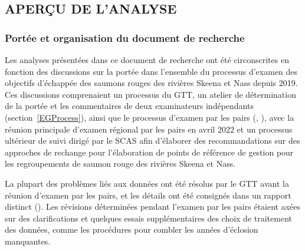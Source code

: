 \documentclass[french,11pt]{book}
\begin{document}
\subsection{APERÇU DE L'ANALYSE}\label{AnalysisOverview}

\subsubsection{Portée et organisation du document de recherche}\label{PaperScopeOrg}

Les analyses présentées dans ce document de recherche ont été circonscrites en fonction des discussions sur la portée dans l'ensemble du processus d'examen des objectifs d'échappée des saumons rouges des rivières Skeena et Nass depuis 2019. Ces discussions comprenaient un processus du GTT, un atelier de détermination de la portée et les commentaires de deux examinateurs indépendants (section~\ref{EGProcess}), ainsi que le processus d'examen par les pairs (, ), avec la réunion principale d'examen régional par les pairs en avril 2022 et un processus ultérieur de suivi dirigé par le SCAS afin d'élaborer des recommandations sur des approches de rechange pour l'élaboration de points de référence de gestion pour les regroupements de saumon rouge des rivières Skeena et Nass.

La plupart des problèmes liés aux données ont été résolus par le GTT avant la réunion d'examen par les pairs, et les détails ont été consignés dans un rapport distinct (). Les révisions déterminées pendant l'examen par les pairs étaient axées sur des clarifications et quelques essais supplémentaires des choix de traitement des données, comme les procédures pour combler les années d'éclosion manquantes.
\end{document}

